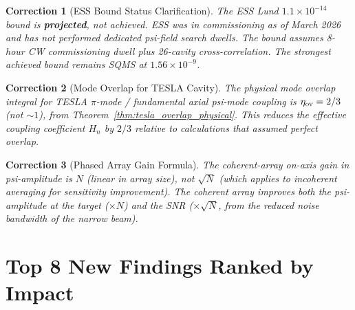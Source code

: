 \documentclass[11pt,twocolumn]{article}
\newcommand{\ee}[1]{\times 10^{#1}}
\newtheorem{correction}{Correction}[section]
\begin{document}
\begin{correction}[ESS Bound Status Clarification]
\label{cor:ess_status}
The ESS Lund $1.1\ee{-14}$ bound is \textbf{projected}, not achieved.
ESS was in commissioning as of March 2026 and has not performed
dedicated psi-field search dwells. The bound assumes 8-hour CW
commissioning dwell plus 26-cavity cross-correlation. The strongest
\emph{achieved} bound remains SQMS at $1.56\ee{-9}$.
\end{correction}

\begin{correction}[Mode Overlap for TESLA Cavity]
\label{cor:mode_overlap}
The physical mode overlap integral for TESLA $\pi$-mode / fundamental
axial psi-mode coupling is $\eta_{\rm ov} = 2/3$ (not $\sim 1$),
from Theorem~\ref{thm:tesla_overlap_physical}. This reduces the
effective coupling coefficient $H_n$ by $2/3$ relative to calculations
that assumed perfect overlap.
\end{correction}

\begin{correction}[Phased Array Gain Formula]
\label{cor:array_gain}
The coherent-array on-axis gain in psi-amplitude is $N$ (linear in
array size), not $\sqrt{N}$ (which applies to \emph{incoherent}
averaging for sensitivity improvement). The coherent array improves
both the psi-amplitude at the target ($\times N$) and the SNR
($\times \sqrt{N}$, from the reduced noise bandwidth of the narrow beam).
\end{correction}


\section{Top 8 New Findings Ranked by Impact}
\label{sec:top8}
\end{document}
